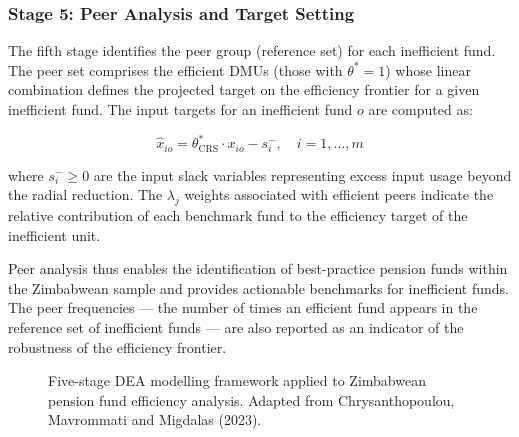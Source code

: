 \documentclass[12pt,a4paper]{article}
\begin{document}
\subsubsection{Stage 5: Peer Analysis and Target Setting}

The fifth stage identifies the peer group (reference set) for each inefficient fund. The peer set comprises the efficient DMUs (those with $\theta^* = 1$) whose linear combination defines the projected target on the efficiency frontier for a given inefficient fund. The input targets for an inefficient fund $o$ are computed as:

\begin{equation}
\hat{x}_{io} = \theta^*_{\text{CRS}} \cdot x_{io} - s^-_i, \quad i = 1, \ldots, m
\end{equation}

where $s^-_i \geq 0$ are the input slack variables representing excess input usage beyond the radial reduction. The $\lambda_j$ weights associated with efficient peers indicate the relative contribution of each benchmark fund to the efficiency target of the inefficient unit.

Peer analysis thus enables the identification of best-practice pension funds within the Zimbabwean sample and provides actionable benchmarks for inefficient funds. The peer frequencies --- the number of times an efficient fund appears in the reference set of inefficient funds --- are also reported as an indicator of the robustness of the efficiency frontier.

\begin{figure}[H]
\centering
{}
\caption{Five-stage DEA modelling framework applied to Zimbabwean pension fund efficiency analysis. Adapted from Chrysanthopoulou, Mavrommati and Migdalas (2023).}
\label{fig:dea_stages}
\end{figure}
\end{document}
